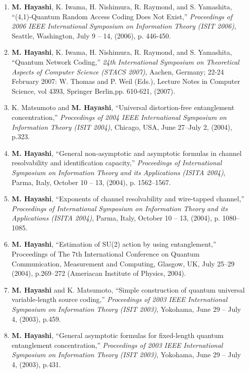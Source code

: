 \documentclass[a4paper,12pt,oneside]{article}
\begin{document}
\begin{enumerate}
\item
\textbf{M. Hayashi}, K. Iwama, H. Nishimura, R. Raymond, and S. Yamashita, ``(4,1)-Quantum Random Access Coding Does Not Exist,'' 
{\em Proceedings of 2006 IEEE International Symposium on Information Theory (ISIT 2006)}, 
Seattle, Washington, July 9 -- 14, (2006), p. 446-450.

\item
\textbf{M. Hayashi}, K. Iwama, H. Nishimura, R. Raymond, and S. Yamashita, ``Quantum Network Coding,'' 
{\em 24th International Symposium on Theoretical Aspects of Computer Science (STACS 2007)}, Aachen, Germany; 22-24 February 2007: 
W. Thomas and P. Weil (Eds.), Lecture Notes in Computer Science, vol 4393, Springer Berlin,pp. 610-621, (2007). 

\item
K. Matsumoto and \textbf{M. Hayashi}, ``Universal distortion-free entanglement concentration,'' 
{\em Proceedings of 2004 IEEE International Symposium on Information Theory (ISIT 2004)}, 
Chicago, USA, June 27--July 2, (2004), p.323.

\item
\textbf{M. Hayashi}, ``General non-asymptotic and asymptotic formulas in channel resolvability and identification capacity,'' 
{\em Proceedings of International Symposium on Information Theory and its Applications (ISITA 2004)}, Parma, Italy, October 10 -- 13, (2004), p. 1562--1567.

\item
\textbf{M. Hayashi}, ``Exponents of channel resolvability and wire-tapped channel,'' 
{\em Proceedings of International Symposium on Information Theory and its Applications (ISITA 2004)}, Parma, Italy, October 10 -- 13, (2004), p. 1080--1085.

\item
\textbf{M. Hayashi},
``Estimation of SU(2) action by using entanglement,'' 
Proceedings of The 7th International Conference on Quantum Communication, Measurement and Computing, Glasgow, UK, July 25--29 (2004), p.269--272 (Ameriacan Institute of Physics, 2004).

\item
\textbf{M. Hayashi} and K. Matsumoto, ``Simple construction of quantum universal variable-length source coding,'' 
{\em Proceedings of 2003 IEEE International Symposium on Information Theory (ISIT 2003)}, 
Yokohama, June 29 -- July 4, (2003), p.459.

\item
\textbf{M. Hayashi}, ``General asymptotic formulas for fixed-length quantum entanglement concentration,'' 
{\em Proceedings of 2003 IEEE International Symposium on Information Theory (ISIT 2003)}, 
Yokohama, June 29 -- July 4, (2003), p.431.


\end{enumerate}
\end{document}
